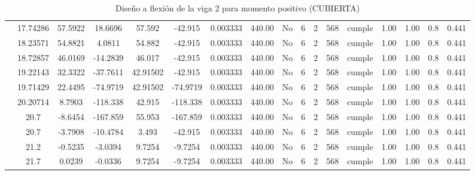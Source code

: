 \begin{table}[H]
{\begin{tabular}{|c|c|c|c|c|c|c|c|c|c|c|c|c|c|c|c|c|}
\cline{2-17}    & 17.74286 & 57.5922 & 18.6696 & 57.592 & -42.915 & 0.003333 & 440.00 & No  & 6   & 2   & 568 & \cellcolor[rgb]{ .776,  .937,  .808}cumple & 1.00 & 1.00 & 0.8 & 0.441 \bigstrut\\
\cline{2-17}    & 18.23571 & 54.8821 & 4.0811 & 54.882 & -42.915 & 0.003333 & 440.00 & No  & 6   & 2   & 568 & \cellcolor[rgb]{ .776,  .937,  .808}cumple & 1.00 & 1.00 & 0.8 & 0.441 \bigstrut\\
\cline{2-17}    & 18.72857 & 46.0169 & -14.2839 & 46.017 & -42.915 & 0.003333 & 440.00 & No  & 6   & 2   & 568 & \cellcolor[rgb]{ .776,  .937,  .808}cumple & 1.00 & 1.00 & 0.8 & 0.441 \bigstrut\\
\cline{2-17}    & 19.22143 & 32.3322 & -37.7611 & 42.91502 & -42.915 & 0.003333 & 440.00 & No  & 6   & 2   & 568 & \cellcolor[rgb]{ .776,  .937,  .808}cumple & 1.00 & 1.00 & 0.8 & 0.441 \bigstrut\\
\cline{2-17}    & 19.71429 & 22.4495 & -74.9719 & 42.91502 & -74.9719 & 0.003333 & 440.00 & No  & 6   & 2   & 568 & \cellcolor[rgb]{ .776,  .937,  .808}cumple & 1.00 & 1.00 & 0.8 & 0.441 \bigstrut\\
\cline{2-17}    & 20.20714 & 8.7903 & -118.338 & 42.915 & -118.338 & 0.003333 & 440.00 & No  & 6   & 2   & 568 & \cellcolor[rgb]{ .776,  .937,  .808}cumple & 1.00 & 1.00 & 0.8 & 0.441 \bigstrut\\
\cline{2-17}    & \cellcolor[rgb]{ .851,  .882,  .949}20.7 & -8.6454 & -167.859 & 55.953 & -167.859 & 0.003333 & 440.00 & No  & 6   & 2   & 568 & \cellcolor[rgb]{ .776,  .937,  .808}cumple & 1.00 & 1.00 & 0.8 & 0.441 \bigstrut\\
\cline{2-17}    & \cellcolor[rgb]{ .851,  .882,  .949}20.7 & -3.7908 & -10.4784 & 3.493 & -42.915 & 0.003333 & 440.00 & No  & 6   & 2   & 568 & \cellcolor[rgb]{ .776,  .937,  .808}cumple & 1.00 & 1.00 & 0.8 & 0.441 \bigstrut\\
\cline{2-17}    & 21.2 & -0.5235 & -3.0394 & 9.7254 & -9.7254 & 0.003333 & 440.00 & No  & 6   & 2   & 568 & \cellcolor[rgb]{ .776,  .937,  .808}cumple & 1.00 & 1.00 & 0.8 & 0.441 \bigstrut\\
\cline{2-17}    & 21.7 & 0.0239 & -0.0336 & 9.7254 & -9.7254 & 0.003333 & 440.00 & No  & 6   & 2   & 568 & \cellcolor[rgb]{ .776,  .937,  .808}cumple & 1.00 & 1.00 & 0.8 & 0.441 \bigstrut\\
\hline
\end{tabular}%



  }%
    \caption{Diseño a flexión de la viga 2 para momento positivo (CUBIERTA) }
  \label{tab:F VG2 CUB M+}%
\end{table}%
